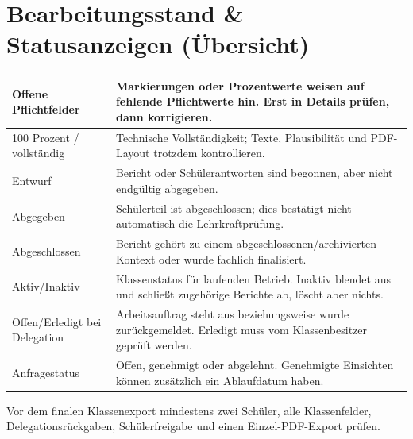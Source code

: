 \documentclass[12pt,a4paper]{article}
\begin{document}
\section{Bearbeitungsstand \& Statusanzeigen (Übersicht)}
\begin{tabularx}{\textwidth}{|p{}|X|}
\hline
Offene Pflichtfelder & Markierungen oder Prozentwerte weisen auf fehlende Pflichtwerte hin. Erst in Details prüfen, dann korrigieren.\\
\hline
100 Prozent / vollständig & Technische Vollständigkeit; Texte, Plausibilität und PDF-Layout trotzdem kontrollieren.\\
\hline
Entwurf & Bericht oder Schülerantworten sind begonnen, aber nicht endgültig abgegeben.\\
\hline
Abgegeben & Schülerteil ist abgeschlossen; dies bestätigt nicht automatisch die Lehrkraftprüfung.\\
\hline
Abgeschlossen & Bericht gehört zu einem abgeschlossenen/archivierten Kontext oder wurde fachlich finalisiert.\\
\hline
Aktiv/Inaktiv & Klassenstatus für laufenden Betrieb. Inaktiv blendet aus und schließt zugehörige Berichte ab, löscht aber nichts.\\
\hline
Offen/Erledigt bei Delegation & Arbeitsauftrag steht aus beziehungsweise wurde zurückgemeldet. Erledigt muss vom Klassenbesitzer geprüft werden.\\
\hline
Anfragestatus & Offen, genehmigt oder abgelehnt. Genehmigte Einsichten können zusätzlich ein Ablaufdatum haben.\\
\hline
\end{tabularx}

Vor dem finalen Klassenexport mindestens zwei Schüler, alle Klassenfelder, Delegationsrückgaben, Schülerfreigabe und einen Einzel-PDF-Export prüfen.
\end{document}
